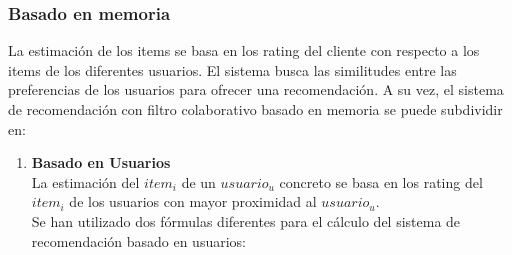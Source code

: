 \subsubsection{Basado en memoria}
La estimación de los items se basa en los rating del cliente con respecto a los items de los diferentes usuarios. El sistema busca las similitudes entre las preferencias de los usuarios para ofrecer una recomendación. 
A su vez, el sistema de recomendación con filtro colaborativo basado en memoria se puede subdividir en: 
\begin{enumerate}

\item  \textbf{Basado en Usuarios}\\ La estimación del  $item_{i}$ de un $usuario_{u}$ concreto se basa en los rating del $item_{i}$  de los usuarios  con mayor proximidad al $usuario_{u}$. \\Se han utilizado dos fórmulas diferentes para el cálculo del sistema de recomendación basado en usuarios: \\ \begin{itemize}


\end{itemize}
\end{enumerate}
